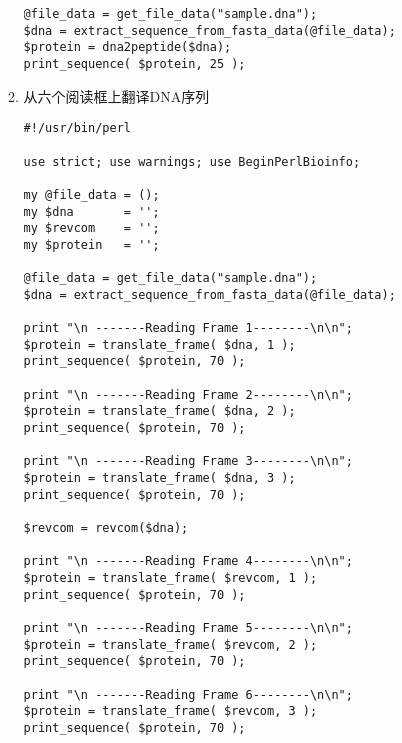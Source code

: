 \documentclass{TIJMUjiaoanSY}
\begin{document}
\begin{enumerate}
\begin{enumerate}
\begin{verbatim}
@file_data = get_file_data("sample.dna");
$dna = extract_sequence_from_fasta_data(@file_data);
$protein = dna2peptide($dna);
print_sequence( $protein, 25 );
\end{verbatim}

\otherTail
\newpage
\otherHeader

      \item 从六个阅读框上翻译DNA序列
\begin{verbatim}
#!/usr/bin/perl

use strict; use warnings; use BeginPerlBioinfo;

my @file_data = ();
my $dna       = '';
my $revcom    = '';
my $protein   = '';

@file_data = get_file_data("sample.dna");
$dna = extract_sequence_from_fasta_data(@file_data);

print "\n -------Reading Frame 1--------\n\n";
$protein = translate_frame( $dna, 1 );
print_sequence( $protein, 70 );

print "\n -------Reading Frame 2--------\n\n";
$protein = translate_frame( $dna, 2 );
print_sequence( $protein, 70 );

print "\n -------Reading Frame 3--------\n\n";
$protein = translate_frame( $dna, 3 );
print_sequence( $protein, 70 );

$revcom = revcom($dna);

print "\n -------Reading Frame 4--------\n\n";
$protein = translate_frame( $revcom, 1 );
print_sequence( $protein, 70 );

print "\n -------Reading Frame 5--------\n\n";
$protein = translate_frame( $revcom, 2 );
print_sequence( $protein, 70 );

print "\n -------Reading Frame 6--------\n\n";
$protein = translate_frame( $revcom, 3 );
print_sequence( $protein, 70 );
\end{verbatim}
    \end{enumerate}
\end{enumerate}

\otherTail

\end{document}
